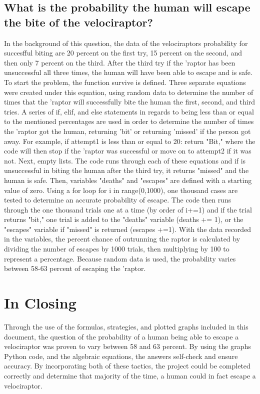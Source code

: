 \documentclass[twocolumn]{revtex4}
\begin{document}
\subsection{What is the probability the human will escape the bite of the velociraptor?}
In the background of this question, the data of the velociraptors probability for succesfful biting are 20 percent on the first try, 15 percent on the second, and then only 7 percent on the third. After the third try if the 'raptor has been unsuccessful all three times, the human will have been able to escape and is safe. To start the problem, the function survive is defined. Three separate equations were created under this equation, using random data to determine the number of times that the 'raptor will successfully bite the human the first, second, and third tries. A series of if, elif, and else statements in regards to being less than or equal to the mentioned percentages are used in order to determine the number of times the 'raptor got the human, returning 'bit' or returning 'missed' if the person got away. For example, if attempt1 is less than or  equal to 20: return "Bit," where the code will then stop if the 'raptor was successful or move on to attempt2 if it was not. Next, empty lists. The code runs through each of these equations and if is unsuccessful in biting the human after the third try, it returns "missed" and the human is safe. Then, variables "deaths" and "escapes" are defined with a starting value of zero. Using a for loop for i in range(0,1000), one thousand cases are tested to determine an accurate probability of escape. The code then runs through the one thousand trials one at a time (by order of i+=1) and if the trial returns "bit," one trial is added to the "deaths" variable (deaths += 1), or the "escapes" variable if "missed" is returned (escapes +=1). With the data recorded in the variables, the percent chance of outrunning the raptor is calculated by dividing the number of escapes by 1000 trials, then multiplying by 100 to represent a percentage. Because random data is used, the probability varies between 58-63 percent of escaping the 'raptor.

\section{In Closing}
Through the use of the formulas, strategies, and plotted graphs included in this document, the question of the probability of a human being able to escape a velociraptor was proven to vary between 58 and 63 percent. By using the graphs Python code, and the algebraic equations, the answers self-check and ensure accuracy. By incorporating both of these tactics, the project could be completed correctly and determine that majority of the time, a human could in fact escape a velociraptor.
\end{document}
